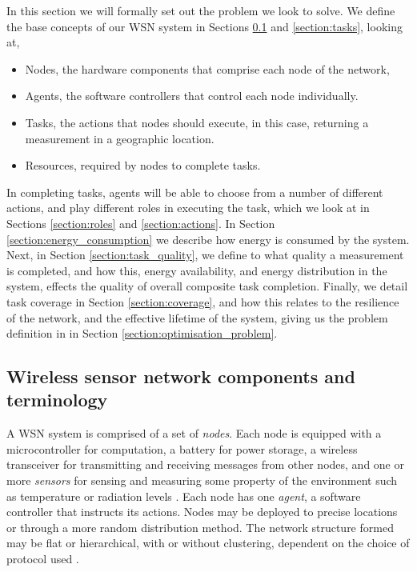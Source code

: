 
In this section we will formally set out the problem we look to solve. We define the base concepts of our WSN system in Sections \ref{section:terminology} and \ref{section:tasks}, looking at,
\begin{itemize}
	\item Nodes, the hardware components that comprise each node of the network,
	\item Agents, the software controllers that control each node individually.
	\item Tasks, the actions that nodes should execute, in this case, returning a measurement in a geographic location.
	\item Resources, required by nodes to complete tasks. 
\end{itemize}
In completing tasks, agents will be able to choose from a number of different actions, and play different roles in executing the task, which we look at in Sections \ref{section:roles} and \ref{section:actions}. In Section \ref{section:energy_consumption} we describe how energy is consumed by the system. Next, in Section \ref{section:task_quality}, we define to what quality a measurement is completed, and how this, energy availability, and energy distribution in the system, effects the quality of overall composite task completion. Finally, we detail task coverage in Section \ref{section:coverage}, and how this relates to the resilience of the network, and the effective lifetime of the system, giving us the problem definition in in Section \ref{section:optimisation_problem}.

\subsection{Wireless sensor network components and terminology}
\label{section:terminology}
A WSN system is comprised of a set of \textit{nodes}. Each node is equipped with a microcontroller for computation, a battery for power storage, a wireless transceiver for  transmitting and receiving messages from other nodes, and one or more \textit{sensors} for sensing and measuring some property of the environment such as temperature or radiation levels \citep{muhammad_r_ahmed_2012_1072589}. Each node has one \textit{agent}, a software controller that instructs its actions. Nodes may be deployed to precise locations or through a more random distribution method. The network structure formed may be flat or hierarchical, with or without clustering, dependent on the choice of protocol used \citep{Carlos-Mancilla2016b}. 

